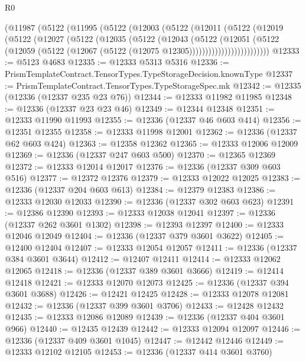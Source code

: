 \begin{lexlean}{R0}
\begin{coremodule}
        (@11987
          (@5122
            (@11995
              (@5122
                (@12003
                  (@5122
                    (@12011
                      (@5122
                        (@12019
                          (@5122
                            (@12027
                              (@5122
                                (@12035
                                  (@5122
                                    (@12043
                                      (@5122
                                        (@12051
                                          (@5122
                                            (@12059
                                              (@5122
                                                (@12067
                                                  (@5122 (@12075 @12305)))))))))))))))))))))))))
@12333 := @5123 @4683
@12335 := @12333 @5313 @5316
@12336 := PrismTemplateContract.TensorTypes.TypeStorageDecision.knownType
@12337 := PrismTemplateContract.TensorTypes.TypeStorageSpec.mk
@12342 := @12335 (@12336 (@12337 @235 @23 @76))
@12344 := @12333 @11982 @11985
@12348 := @12336 (@12337 @23 @23 @46)
@12349 := @12344 @12348
@12351 := @12333 @11990 @11993
@12355 := @12336 (@12337 @46 @603 @414)
@12356 := @12351 @12355
@12358 := @12333 @11998 @12001
@12362 := @12336 (@12337 @62 @603 @424)
@12363 := @12358 @12362
@12365 := @12333 @12006 @12009
@12369 := @12336 (@12337 @247 @603 @500)
@12370 := @12365 @12369
@12372 := @12333 @12014 @12017
@12376 := @12336 (@12337 @309 @603 @516)
@12377 := @12372 @12376
@12379 := @12333 @12022 @12025
@12383 := @12336 (@12337 @204 @603 @613)
@12384 := @12379 @12383
@12386 := @12333 @12030 @12033
@12390 := @12336 (@12337 @302 @603 @623)
@12391 := @12386 @12390
@12393 := @12333 @12038 @12041
@12397 := @12336 (@12337 @262 @3601 @1302)
@12398 := @12393 @12397
@12400 := @12333 @12046 @12049
@12404 := @12336 (@12337 @379 @3601 @3622)
@12405 := @12400 @12404
@12407 := @12333 @12054 @12057
@12411 := @12336 (@12337 @384 @3601 @3644)
@12412 := @12407 @12411
@12414 := @12333 @12062 @12065
@12418 := @12336 (@12337 @389 @3601 @3666)
@12419 := @12414 @12418
@12421 := @12333 @12070 @12073
@12425 := @12336 (@12337 @394 @3601 @3688)
@12426 := @12421 @12425
@12428 := @12333 @12078 @12081
@12432 := @12336 (@12337 @399 @3601 @3706)
@12433 := @12428 @12432
@12435 := @12333 @12086 @12089
@12439 := @12336 (@12337 @404 @3601 @966)
@12440 := @12435 @12439
@12442 := @12333 @12094 @12097
@12446 := @12336 (@12337 @409 @3601 @1045)
@12447 := @12442 @12446
@12449 := @12333 @12102 @12105
@12453 := @12336 (@12337 @414 @3601 @3760)

\end{coremodule}
\end{lexlean}
